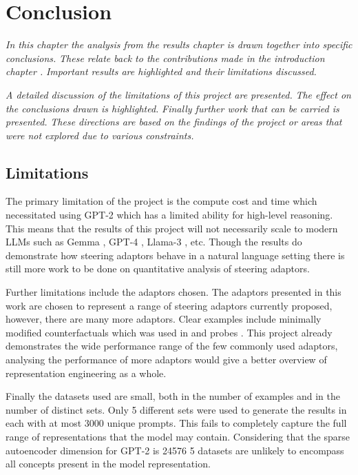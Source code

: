 \chapter{Conclusion}
\label{ch:conclusion}

\emph{In this chapter the analysis from the results chapter  is drawn together into specific conclusions.}
\emph{These relate back to the contributions made in the introduction chapter .}
\emph{Important results are highlighted and their limitations discussed.}

\emph{A detailed discussion of the limitations of this project are presented.}
\emph{The effect on the conclusions drawn is highlighted.}
\emph{Finally further work that can be carried is presented.}
\emph{These directions are based on the findings of the project or areas that were not explored due to various constraints.}

\section{Limitations}

The primary limitation of the project is the compute cost and time which necessitated using GPT-2 which has a limited ability for high-level reasoning.
This means that the results of this project will not necessarily scale to modern LLMs such as Gemma \citep{gemma}, GPT-4 \citep{gpt-4}, Llama-3 \citep{llama3}, etc.
Though the results do demonstrate how steering adaptors behave in a natural language setting there is still more work to be done on quantitative analysis of steering adaptors.

Further limitations include the adaptors chosen.
The adaptors presented in this work are chosen to represent a range of steering adaptors currently proposed, however, there are many more adaptors.
Clear examples include minimally modified counterfactuals \citep{mimic} which was used in \citet{steering-clear} and probes \citep{probes}.
This project already demonstrates the wide performance range of the few commonly used adaptors, analysing the performance of more adaptors would give a better overview of representation engineering as a whole.

Finally the datasets used are small, both in the number of examples and in the number of distinct sets.
Only 5 different sets were used to generate the results in  each with at most 3000 unique prompts.
This fails to completely capture the full range of representations that the model may contain.
Considering that the sparse autoencoder dimension for GPT-2 is 24576 \citep{saelens} 5 datasets are unlikely to encompass all concepts present in the model representation.

